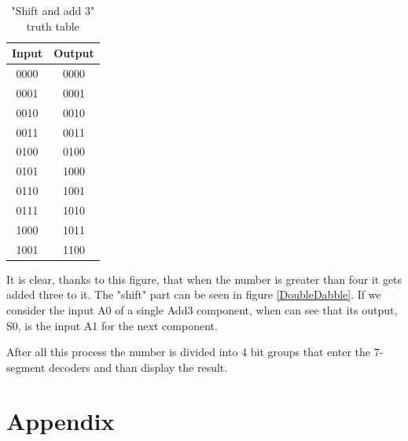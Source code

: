 \documentclass{article}
\begin{document}
\begin{table}[h]
  \centering
  \begin{tabular}{||c|c||}
    \hline
    Input & Output \\
    \hline
    0000 & 0000 \\
    0001 & 0001 \\
    0010 & 0010 \\ 
    0011 & 0011 \\
    0100 & 0100 \\
    0101 & 1000 \\
    0110 & 1001 \\
    0111 & 1010 \\
    1000 & 1011 \\
    1001 & 1100 \\
    \hline
  \end{tabular}
    \label{Add3Table}
    \caption{"Shift and add 3" truth table}
  \end{table}

It is clear, thanks to this figure, that when the number is greater than four it gets added three to it. The "shift" part can be seen in figure \ref{DoubleDabble}. If we consider the input A0 of a single Add3 component, when can see that its output, S0, is the input A1 for the next component.

After all this process the number is divided into 4 bit groups that enter the 7-segment decoders and than display the result.






\clearpage
\section{Appendix}
\end{document}

